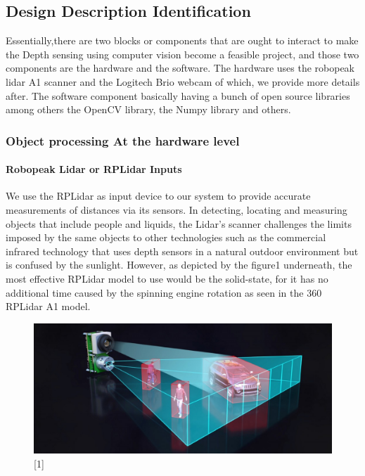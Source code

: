 \documentclass[10pt,draftclsnofoot,onecolumn,journal,compsoc]{IEEEtran}
\begin{document}
    \subsection{Design Description Identification}
   Essentially,there are two blocks or components that are ought to interact  to make the Depth sensing using computer vision become a feasible project, and those two components are the hardware and the software. The hardware uses the robopeak lidar A1 scanner and the Logitech Brio webcam of which, we provide more details after. The software component basically having a bunch of open source libraries among others the OpenCV library, the Numpy library and others.  
    	\subsubsection{Object processing At the hardware level}
    	\paragraph{\textbf {Robopeak Lidar or RPLidar Inputs}} 	
    	We use the RPLidar as input device to our system to provide accurate measurements of distances via its sensors. In detecting, locating and measuring objects that include people and liquids, the Lidar's scanner challenges the limits imposed by the same objects to other technologies such as the commercial infrared technology that uses  depth sensors in a natural outdoor environment but is confused by the sunlight. However, as depicted by the figure1 underneath, the most effective RPLidar model to use would be the solid-state, for it has no additional time caused by the spinning engine rotation as seen in the 360 RPLidar A1 model.
    	\\[2ex]
    	\begin{figure}[ht]
    	 \centering \includegraphics[width=4.5in,natwidth=4000,natheight=200]{images/LiDAR-fundamentals-2-1024x449.eps}
    	\label{rplidar2}
    	\end{figure}
\end{document}
